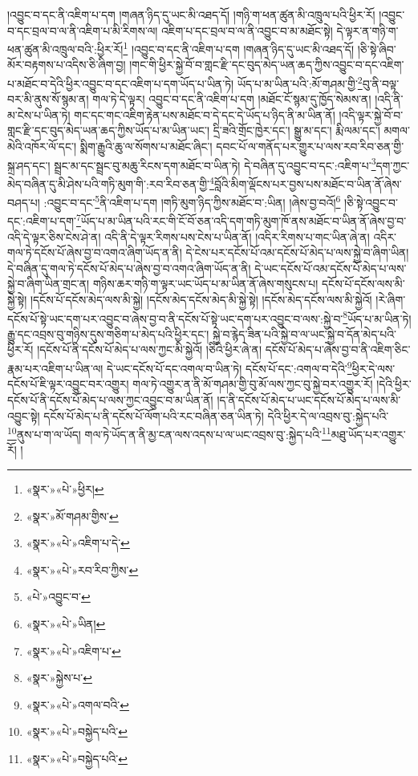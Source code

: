 །འབྱུང་བ་དང་ནི་འཇིག་པ་དག །གཞན་ཉིད་དུ་ཡང་མི་འཐད་དོ། །གཉི་ག་ཕན་ཚུན་མི་འཁྲུལ་པའི་ཕྱིར་རོ། །འབྱུང་བ་དང་བྲལ་བ་ལ་ནི་འཇིག་པ་མི་རིགས་ལ། འཇིག་པ་དང་བྲལ་བ་ལ་ནི་འབྱུང་བ་མ་མཐོང་སྟེ། དེ་ལྟར་ན་གཉི་ག་ཕན་ཚུན་མི་འཁྲུལ་བའི་:ཕྱིར་རོ།\footnote{«སྣར་»«པེ་»ཕྱིར།} །འབྱུང་བ་དང་ནི་འཇིག་པ་དག །གཞན་ཉིད་དུ་ཡང་མི་འཐད་དོ། །ཅི་སྟེ་ཞིབ་མོར་བརྟགས་པ་འདིས་ཅི་ཞིག་བྱ། །གང་གི་ཕྱིར་སྐྱེ་བོ་བ་གླང་རྫི་དང་བུད་མེད་ཡན་ཆད་ཀྱིས་འབྱུང་བ་དང་འཇིག་པ་མཐོང་བ་དེའི་ཕྱིར་འབྱུང་བ་དང་འཇིག་པ་དག་ཡོད་པ་ཡིན་ཏེ། ཡོད་པ་མ་ཡིན་པའི་:མོ་གཤམ་གྱི་\footnote{«སྣར་»མོ་གཤམ་གྱིས་}བུ་ནི་བལྟ་བར་མི་ནུས་སོ་སྙམ་ན། གལ་ཏེ་དེ་ལྟར། འབྱུང་བ་དང་ནི་འཇིག་པ་དག །མཐོང་ངོ་སྙམ་དུ་ཁྱོད་སེམས་ན། །འདི་ནི་མ་ངེས་པ་ཡིན་ཏེ། གང་དང་གང་འཇིག་རྟེན་པས་མཐོང་བ་དེ་དང་དེ་ཡོད་པ་ཉིད་ནི་མ་ཡིན་ནོ། །འདི་ལྟར་སྐྱེ་བོ་བ་གླང་རྫི་དང་བུད་མེད་ཡན་ཆད་ཀྱིས་ཡོད་པ་མ་ཡིན་ཡང་། དྲི་ཟའི་གྲོང་ཁྱེར་དང་། སྒྱུ་མ་དང་། རྨི་ལམ་དང་། མགལ་མེའི་འཁོར་ལོ་དང་། སྨིག་རྒྱུའི་ཆུ་ལ་སོགས་པ་མཐོང་ཞིང་། དབང་པོ་ལ་གནོད་པར་གྱུར་པ་ལས་རབ་རིབ་ཅན་གྱི་སྐྲ་ཤད་དང་། སྦྲང་མ་དང་སྦྲང་བུ་མཆུ་རིངས་དག་མཐོང་བ་ཡིན་ཏེ། དེ་བཞིན་དུ་འབྱུང་བ་དང་:འཇིག་པ་\footnote{«སྣར་»«པེ་»འཇིག་པ་དེ་}དག་ཀྱང་མེད་བཞིན་དུ་མི་ཤེས་པའི་གཏི་མུག་གི་:རབ་རིབ་ཅན་གྱི་\footnote{«སྣར་»«པེ་»རབ་རིབ་ཀྱིས་}བློའི་མིག་ལྡོངས་པར་བྱས་པས་མཐོང་བ་ཡིན་ནོ་ཞེས་བཤད་པ། :འབྱུང་བ་དང་\footnote{«པེ་»འབྱུང་བ་}ནི་འཇིག་པ་དག །གཏི་མུག་ཉིད་ཀྱིས་མཐོང་བ་:ཡིན། །ཞེས་བྱ་བའོ།\footnote{«སྣར་»«པེ་»ཡིན།} །ཅི་སྟེ་འབྱུང་བ་དང་:འཇིག་པ་དག་\footnote{«སྣར་»«པེ་»འཇིག་པ་}ཡོད་པ་མ་ཡིན་པའི་རང་གི་ངོ་བོ་ཅན་འདི་དག་གཏི་མུག་ཁོ་ནས་མཐོང་བ་ཡིན་ནོ་ཞེས་བྱ་བ་འདི་དེ་ལྟར་ཅིས་ངེས་ཤེ་ན། འདི་ནི་དེ་ལྟར་རིགས་པས་ངེས་པ་ཡིན་ནོ། །འདིར་རིགས་པ་གང་ཡིན་ཞེ་ན། འདིར་གལ་ཏེ་དངོས་པོ་ཞེས་བྱ་བ་འགའ་ཞིག་ཡོད་ན་ནི། དེ་ངེས་པར་དངོས་པོ་འམ་དངོས་པོ་མེད་པ་ལས་སྐྱེ་བ་ཞིག་ཡིན། དེ་བཞིན་དུ་གལ་ཏེ་དངོས་པོ་མེད་པ་ཞེས་བྱ་བ་འགའ་ཞིག་ཡོད་ན་ནི། དེ་ཡང་དངོས་པོ་འམ་དངོས་པོ་མེད་པ་ལས་སྐྱེ་བ་ཞིག་ཡིན་གྲང་ན། གཉིས་ཆར་གཉི་ག་ལྟར་ཡང་ཡོད་པ་མ་ཡིན་ནོ་ཞེས་གསུངས་པ། དངོས་པོ་དངོས་ལས་མི་སྐྱེ་སྟེ། །དངོས་པོ་དངོས་མེད་ལས་མི་སྐྱེ། །དངོས་མེད་དངོས་མེད་མི་སྐྱེ་སྟེ། །དངོས་མེད་དངོས་ལས་མི་སྐྱེའོ། །རེ་ཞིག་དངོས་པོ་སྟེ་ཡང་དག་པར་འབྱུང་བ་ཞེས་བྱ་བ་ནི་དངོས་པོ་སྟེ་ཡང་དག་པར་འབྱུང་བ་ལས་:སྐྱེ་བ་\footnote{«སྣར་»སྐྱེས་པ་}ཡོད་པ་མ་ཡིན་ཏེ། རྒྱུ་དང་འབྲས་བུ་གཉིས་དུས་གཅིག་པ་མེད་པའི་ཕྱིར་དང་། སྐྱེ་བ་རྙེད་ཟིན་པའི་སྐྱེ་བ་ལ་ཡང་སྐྱེ་བ་དོན་མེད་པའི་ཕྱིར་རོ། །དངོས་པོ་ནི་དངོས་པོ་མེད་པ་ལས་ཀྱང་མི་སྐྱེའོ། །ཅིའི་ཕྱིར་ཞེ་ན། དངོས་པོ་མེད་པ་ཞེས་བྱ་བ་ནི་འཇིག་ཅིང་རྣམ་པར་འཇིག་པ་ཡིན་ལ། དེ་ཡང་དངོས་པོ་དང་འགལ་བ་ཡིན་ཏེ། དངོས་པོ་དང་:འགལ་བ་དེའི་\footnote{«སྣར་»«པེ་»འགལ་བའི་}ཕྱིར་དེ་ལས་དངོས་པོ་ཇི་ལྟར་འབྱུང་བར་འགྱུར། གལ་ཏེ་འགྱུར་ན་ནི་མོ་གཤམ་གྱི་བུ་མོ་ལས་ཀྱང་བུ་སྐྱེ་བར་འགྱུར་རོ། །དེའི་ཕྱིར་དངོས་པོ་ནི་དངོས་པོ་མེད་པ་ལས་ཀྱང་འབྱུང་བ་མ་ཡིན་ནོ། །ད་ནི་དངོས་པོ་མེད་པ་ཡང་དངོས་པོ་མེད་པ་ལས་མི་འབྱུང་སྟེ། དངོས་པོ་མེད་པ་ནི་དངོས་པོ་ལོག་པའི་རང་བཞིན་ཅན་ཡིན་ཏེ། དེའི་ཕྱིར་དེ་ལ་འབྲས་བུ་:སྐྱེད་པའི་\footnote{«སྣར་»«པེ་»བསྐྱེད་པའི་}ནུས་པ་ག་ལ་ཡོད། གལ་ཏེ་ཡོད་ན་ནི་མྱ་ངན་ལས་འདས་པ་ལ་ཡང་འབྲས་བུ་:སྐྱེད་པའི་\footnote{«སྣར་»«པེ་»བསྐྱེད་པའི་}མཐུ་ཡོད་པར་འགྱུར་རོ། །
